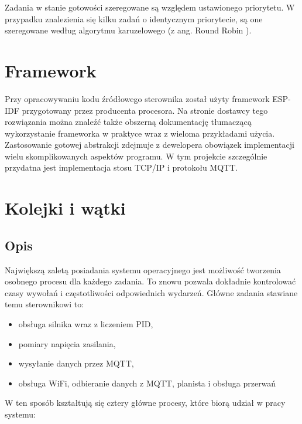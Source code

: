             Zadania w stanie gotowości szeregowane są względem ustawionego priorytetu. W przypadku znalezienia się kilku zadań o identycznym priorytecie, są one szeregowane według algorytmu karuzelowego (z ang. Round Robin \cite{round_robin}).
            
        \section{Framework}
            Przy opracowywaniu kodu źródłowego sterownika został użyty framework ESP-IDF \cite{esp-idf} przygotowany przez producenta procesora. Na stronie dostawcy tego rozwiązania można znaleźć także obszerną dokumentację tłumaczącą wykorzystanie frameworka w praktyce wraz z wieloma przykładami użycia. Zastosowanie gotowej abstrakcji zdejmuje z dewelopera obowiązek implementacji wielu skomplikowanych aspektów programu. W tym projekcie szczególnie przydatna jest implementacja stosu TCP/IP i protokołu MQTT.
    
    
        \section{Kolejki i wątki}
            \subsection{Opis}
            Największą zaletą posiadania systemu operacyjnego jest możliwość tworzenia osobnego procesu dla każdego zadania. To znowu pozwala dokładnie kontrolować czasy wywołań i częstotliwości odpowiednich wydarzeń. Główne zadania stawiane temu sterownikowi to:
            
            \begin{itemize}
                \item obsługa silnika wraz z liczeniem PID,
                \item pomiary napięcia zasilania,
                \item wysyłanie danych przez MQTT,
                \item obsługa WiFi, odbieranie danych z MQTT, planista i obsługa przerwań
            \end{itemize}
            
            W ten sposób kształtują się cztery główne procesy, które biorą udział w pracy systemu:
            
